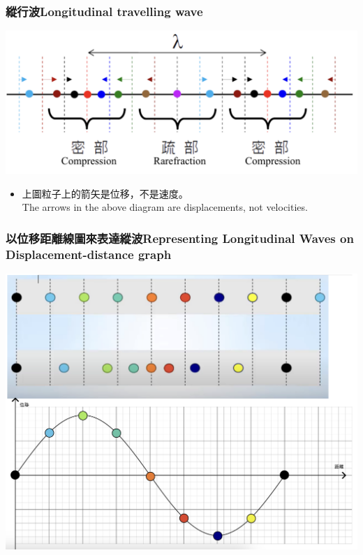 \documentclass[beamer=true]{standalone}
\begin{document}


\begin{frame}
    \frametitle{縱行波Longitudinal travelling wave}
    \par{\par\centering\includegraphics[width=\textwidth]{./img/ch1b_2024-05-17-13-51-46.png}\par}
    \begin{itemize}
        \item 上圖粒子上的箭矢是位移，不是速度。\\The arrows in the above diagram are displacements, not velocities.
    \end{itemize}
\end{frame}



\begin{frame}
    \frametitle{以位移距離線圖來表達縱波Representing Longitudinal Waves on Displacement-distance graph}

    \par{\par\centering\includegraphics[width=.8\textwidth]{./img/ch1b_2024-05-17-12-14-25.png}\par}

\end{frame}
\end{document}
